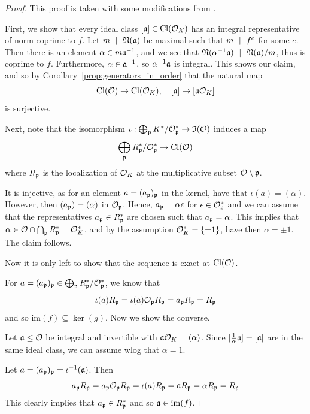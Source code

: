 \begin{proof}
    This proof is taken with some modifications from \cite[Prop.~I.12.11]{neukirch}.

    First, we show that every ideal class $[\mathfrak{a}] \in \mathrm{Cl}(\mathcal{O}_K)$ has an integral representative of norm coprime to $f$.
    Let $m \ \mid \  \mathfrak{N}(\mathfrak{a})$ be maximal such that $m \ \mid \  f^e$ for some $e$.
    Then there is an element $\alpha \in m\mathfrak{a}^{-1}$, and we see that $\mathfrak{N}(\alpha^{-1}\mathfrak{a}) \ \mid \  \mathfrak{N}(\mathfrak{a})/m$, thus is coprime to $f$.
    Furthermore, $\alpha \in \mathfrak{a}^{-1}$, so $\alpha^{-1}\mathfrak{a}$ is integral.
    This shows our claim, and so by Corollary~\ref{prop:generators_in_order} that the natural map
    \begin{equation*}
        \mathrm{Cl}(\mathcal{O}) \to \mathrm{Cl}(\mathcal{O}_K), \quad [\mathfrak{a}] \to [\mathfrak{a}\mathcal{O}_K]
    \end{equation*}
    is surjective.

    Next, note that the isomorphism $\iota: \bigoplus_{\mathfrak{p}} K^*/\mathcal{O}_{\mathfrak{p}}^* \to \mathfrak{I}(\mathcal{O})$ induces a map
    \begin{equation*}
        \bigoplus_{\mathfrak{p}} R_{\mathfrak{p}}^*/\mathcal{O}_{\mathfrak{p}}^* \to \mathrm{Cl}(\mathcal{O})
    \end{equation*}
    where $R_{\mathfrak{p}}$ is the localization of $\mathcal{O}_K$ at the multiplicative subset $\mathcal{O} \setminus \mathfrak{p}$.

    It is injective, as for an element $a = (a_{\mathfrak{p}})_{\mathfrak{p}}$ in the kernel, have that $\iota(a) = (\alpha)$.
    However, then $(a_{\mathfrak{p}}) = (\alpha)$ in $\mathcal{O}_{\mathfrak{p}}$.
    Hence, $a_{\mathfrak{p}} = \alpha\epsilon$ for $\epsilon \in \mathcal{O}_{\mathfrak{p}}^*$ and we can assume that the representatives $a_{\mathfrak{p}} \in R_{\mathfrak{p}}^*$ are chosen such that $a_{\mathfrak{p}} = \alpha$.
    This implies that $\alpha \in \mathcal{O} \cap \bigcap_{\mathfrak{p}} R_{\mathfrak{p}}^* = \mathcal{O}_K^*$, and by the assumption $\mathcal{O}_K^* = \{ \pm 1 \}$, have then $\alpha = \pm 1$.
    The claim follows.

    Now it is only left to show that the sequence is exact at $\mathrm{Cl}(\mathcal{O})$.

    For $a = (a_{\mathfrak{p}})_{\mathfrak{p}} \in \bigoplus_{\mathfrak{p}} R_{\mathfrak{p}}^*/\mathcal{O}_{\mathfrak{p}}^*$, we know that
    \begin{equation*}
        \iota(a)R_{\mathfrak{p}} = \iota(a)\mathcal{O}_{\mathfrak{p}} R_{\mathfrak{p}} = a_{\mathfrak{p}} R_{\mathfrak{p}} = R_{\mathfrak{p}}
    \end{equation*}
    and so $\mathrm{im}(f) \subseteq \ker(g)$.
    Now we show the converse.

    Let $\mathfrak{a} \leq \mathcal{O}$ be integral and invertible with $\mathfrak{a}\mathcal{O}_K = (\alpha)$.
    Since $[\frac 1 \alpha \mathfrak{a}] = [\mathfrak{a}]$ are in the same ideal class, we can assume wlog that $\alpha = 1$.

    Let $a = (a_{\mathfrak{p}})_{\mathfrak{p}} = \iota^{-1}(\mathfrak{a})$.
    Then
    \begin{equation*}
        a_{\mathfrak{p}} R_{\mathfrak{p}} = a_{\mathfrak{p}}\mathcal{O}_{\mathfrak{p}} R_{\mathfrak{p}} = \iota(a)R_{\mathfrak{p}} = \mathfrak{a} R_{\mathfrak{p}} = \alpha R_{\mathfrak{p}} = R_{\mathfrak{p}}
    \end{equation*}
    This clearly implies that $a_{\mathfrak{p}} \in R_{\mathfrak{p}}^*$ and so $\mathfrak{a} \in \mathrm{im}(f)$.
\end{proof}
